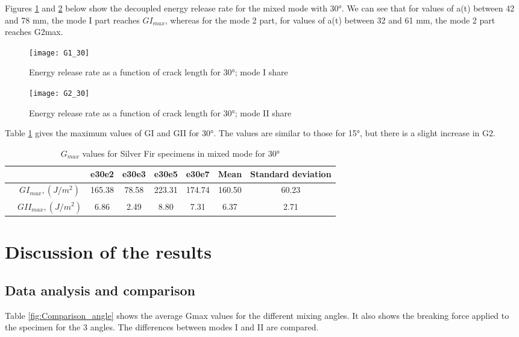 Figures \ref{fig:G1_30} and \ref{fig:G2_30} below show the decoupled energy release rate for the mixed mode with 30°.
We can see that for values of a(t) between 42 and 78 mm, the mode I part reaches $GI_{max}$, whereas for the mode 2 part, for values of a(t) between 32 and 61 mm, the mode 2 part reaches G2max. 

\begin{figure}[htp]
	\centering
	\texttt{[image: G1\_30]}
	\caption{Energy release rate as a function of crack length for 30°; mode I share}
	\label{fig:G1_30}
\end{figure}


\begin{figure}[htp]
	\centering
	\texttt{[image: G2\_30]}
	\caption{Energy release rate as a function of crack length for 30°; mode II share}
	\label{fig:G2_30}
\end{figure}

Table \ref{fig:tableG30} gives the maximum values of GI and GII for 30°. The values are similar to those for 15°, but there is a slight increase in G2.

\begin{table} [H]
	\centering
	\begin{tabular}{cccccccc}
		\toprule %
		&  & e30e2 & e30e3 & e30e5 & e30e7 & Mean & Standard deviation\\\midrule
		& $GI_{max}, (J/m^2)$ & 165.38 & 78.58 & 223.31 & 174.74 & 160.50 & 60.23 \\\midrule
		& $GII_{max}, (J/m^2)$ & 6.86 & 2.49 & 8.80 & 7.31 & 6.37 & 2.71\\\midrule
	\end{tabular}
	\caption{$G_{max}$ values for Silver Fir specimens in mixed mode for 30°}
	\label{fig:tableG30}
\end{table}

\section{Discussion of the results}

\subsection{Data analysis and comparison}

Table \ref{fig:Comparison_angle} shows the average Gmax values for the different mixing angles.  It also shows the breaking force applied to the specimen for the 3 angles. The differences between modes I and II are compared.

